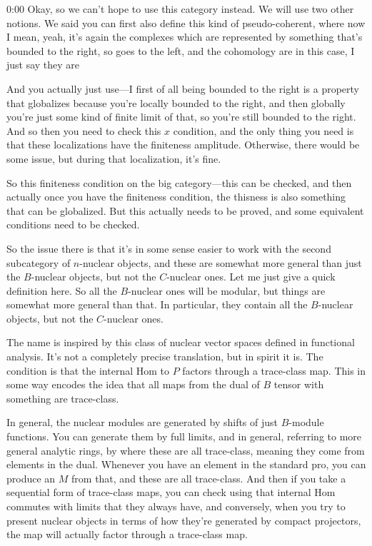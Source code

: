 \begin{unfinished}{0:00}
Okay, so we can't hope to use this category instead. We will use two other notions. We said you can first also define this kind of pseudo-coherent, where now I mean, yeah, it's again the complexes which are represented by something that's bounded to the right, so goes to the left, and the cohomology are in this case, I just say they are

And you actually just use---I first of all being bounded to the right is a property that globalizes because you're locally bounded to the right, and then globally you're just some kind of finite limit of that, so you're still bounded to the right. And so then you need to check this $x$ condition, and the only thing you need is that these localizations have the finiteness amplitude. Otherwise, there would be some issue, but during that localization, it's fine.

So this finiteness condition on the big category---this can be checked, and then actually once you have the finiteness condition, the thisness is also something that can be globalized. But this actually needs to be proved, and some equivalent conditions need to be checked.

So the issue there is that it's in some sense easier to work with the second subcategory of $n$-nuclear objects, and these are somewhat more general than just the $B$-nuclear objects, but not the $C$-nuclear ones. Let me just give a quick definition here. So all the $B$-nuclear ones will be modular, but things are somewhat more general than that. In particular, they contain all the $B$-nuclear objects, but not the $C$-nuclear ones.

The name is inspired by this class of nuclear vector spaces defined in functional analysis. It's not a completely precise translation, but in spirit it is. The condition is that the internal Hom to $P$ factors through a trace-class map. This in some way encodes the idea that all maps from the dual of $B$ tensor with something are trace-class.

In general, the nuclear modules are generated by shifts of just $B$-module functions. You can generate them by full limits, and in general, referring to more general analytic rings, by where these are all trace-class, meaning they come from elements in the dual. Whenever you have an element in the standard pro, you can produce an $M$ from that, and these are all trace-class. And then if you take a sequential form of trace-class maps, you can check using that internal Hom commutes with limits that they always have, and conversely, when you try to present nuclear objects in terms of how they're generated by compact projectors, the map will actually factor through a trace-class map.


\end{unfinished}
